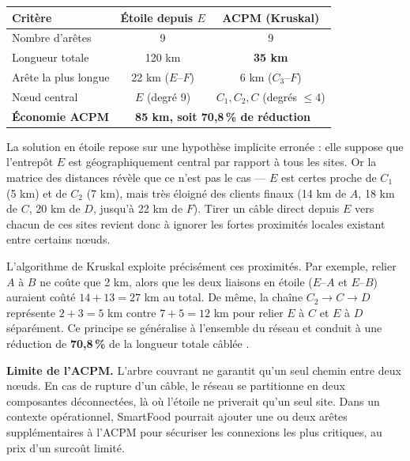 \documentclass[12pt,a4paper]{article}
\begin{document}
\begin{center}\small
{}
\begin{tabular}{lcc}
\toprule
\textbf{Critère} & \textbf{Étoile depuis $E$} & \textbf{ACPM (Kruskal)}\\
\midrule
Nombre d'arêtes               & 9 & 9\\
Longueur totale               & 120 km & \textbf{35 km}\\
Arête la plus longue          & 22 km ($E$--$F$) & 6 km ($C_3$--$F$)\\
Nœud central                  & $E$ (degré 9) & $C_1, C_2, C$ (degrés $\leq 4$)\\
\midrule
\textbf{Économie ACPM}        & \multicolumn{2}{c}{\textbf{85 km, soit 70,8\,\% de réduction}}\\
\bottomrule
\end{tabular}
\end{center}

\medskip

La solution en étoile repose sur une hypothèse implicite erronée : elle suppose que
l'entrepôt $E$ est géographiquement central par rapport à tous les sites. Or la matrice
des distances révèle que ce n'est pas le cas --- $E$ est certes proche de $C_1$ (5 km)
et de $C_2$ (7 km), mais très éloigné des clients finaux (14 km de $A$, 18 km de $C$,
20 km de $D$, jusqu'à 22 km de $F$). Tirer un câble direct depuis $E$ vers chacun de
ces sites revient donc à ignorer les fortes proximités locales existant entre certains
nœuds.

L'algorithme de Kruskal exploite précisément ces proximités. Par exemple, relier $A$
à $B$ ne coûte que 2 km, alors que les deux liaisons en étoile ($E$--$A$ et $E$--$B$)
auraient coûté $14+13=27$ km au total. De même, la chaîne $C_2 \to C \to D$ représente
$2+3=5$ km contre $7+5=12$ km pour relier $E$ à $C$ et $E$ à $D$ séparément. Ce
principe se généralise à l'ensemble du réseau et conduit à une réduction de
\textbf{70,8\,\%} de la longueur totale câblée \cite{cours4GI_graphes}.

\begin{alertbox}
\textbf{Limite de l'ACPM.} L'arbre couvrant ne garantit qu'un seul chemin entre deux
nœuds. En cas de rupture d'un câble, le réseau se partitionne en deux composantes
déconnectées, là où l'étoile ne priverait qu'un seul site. Dans un contexte
opérationnel, SmartFood pourrait ajouter une ou deux arêtes supplémentaires à l'ACPM
pour sécuriser les connexions les plus critiques, au prix d'un surcoût limité.
\end{alertbox}
\end{document}
